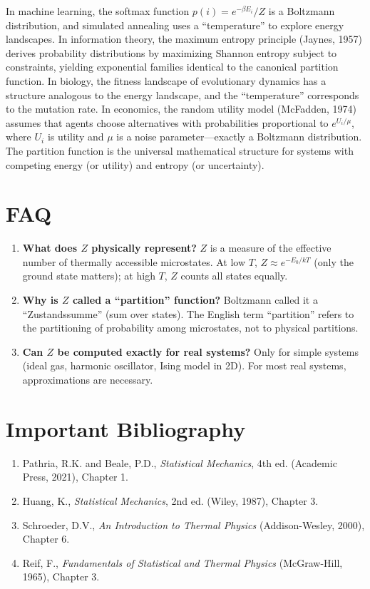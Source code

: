 In machine learning, the softmax function $p(i) = e^{-\beta E_{i}}/Z$ is a Boltzmann distribution, and simulated annealing uses a ``temperature'' to explore energy landscapes. In information theory, the maximum entropy principle (Jaynes, 1957) derives probability distributions by maximizing Shannon entropy subject to constraints, yielding exponential families identical to the canonical partition function. In biology, the fitness landscape of evolutionary dynamics has a structure analogous to the energy landscape, and the ``temperature'' corresponds to the mutation rate. In economics, the random utility model (McFadden, 1974) assumes that agents choose alternatives with probabilities proportional to $e^{U_{i}/\mu}$, where $U_{i}$ is utility and $\mu$ is a noise parameter---exactly a Boltzmann distribution. The partition function is the universal mathematical structure for systems with competing energy (or utility) and entropy (or uncertainty).

\section*{FAQ}

\begin{enumerate}
\item \textbf{What does $Z$ physically represent?}
$Z$ is a measure of the effective number of thermally accessible microstates. At low $T$, $Z \approx e^{-E_{0}/kT}$ (only the ground state matters); at high $T$, $Z$ counts all states equally.

\item \textbf{Why is $Z$ called a ``partition'' function?}
Boltzmann called it a ``Zustandssumme'' (sum over states). The English term ``partition'' refers to the partitioning of probability among microstates, not to physical partitions.

\item \textbf{Can $Z$ be computed exactly for real systems?}
Only for simple systems (ideal gas, harmonic oscillator, Ising model in 2D). For most real systems, approximations are necessary.
\end{enumerate}
\section*{Important Bibliography}

\begin{enumerate}
\item Pathria, R.K. and Beale, P.D., \textit{Statistical Mechanics}, 4th ed. (Academic Press, 2021), Chapter 1.
\item Huang, K., \textit{Statistical Mechanics}, 2nd ed. (Wiley, 1987), Chapter 3.
\item Schroeder, D.V., \textit{An Introduction to Thermal Physics} (Addison-Wesley, 2000), Chapter 6.
\item Reif, F., \textit{Fundamentals of Statistical and Thermal Physics} (McGraw-Hill, 1965), Chapter 3.
\end{enumerate}

